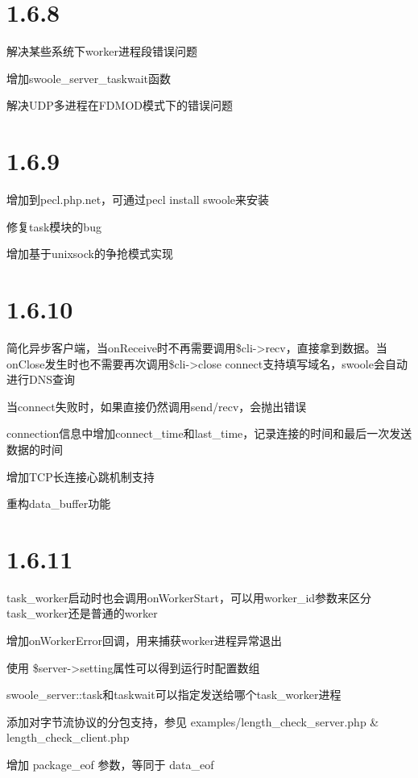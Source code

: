 \section{1.6.8}


\begin{compactitem}
\item 解决某些系统下worker进程段错误问题
\item 增加swoole\_server\_taskwait函数
\item 解决UDP多进程在FDMOD模式下的错误问题
\end{compactitem}

\section{1.6.9}

\begin{compactitem}
\item 增加到pecl.php.net，可通过pecl install swoole来安装
\item 修复task模块的bug
\item 增加基于unixsock的争抢模式实现
\end{compactitem}

\section{1.6.10}


\begin{compactitem}
\item 简化异步客户端，当onReceive时不再需要调用\$cli->recv，直接拿到数据。当onClose发生时也不需要再次调用\$cli->close
connect支持填写域名，swoole会自动进行DNS查询
\item 当connect失败时，如果直接仍然调用send/recv，会抛出错误
\item connection信息中增加connect\_time和last\_time，记录连接的时间和最后一次发送数据的时间
\item 增加TCP长连接心跳机制支持
\item 重构data\_buffer功能
\end{compactitem}

\section{1.6.11}


\begin{compactitem}
\item task\_worker启动时也会调用onWorkerStart，可以用worker\_id参数来区分task\_worker还是普通的worker
\item 增加onWorkerError回调，用来捕获worker进程异常退出
\item 使用 \$server->setting属性可以得到运行时配置数组
\item swoole\_server::task和taskwait可以指定发送给哪个task\_worker进程
\item 添加对字节流协议的分包支持，参见 examples/length\_check\_server.php \& length\_check\_client.php
\item 增加 package\_eof 参数，等同于 data\_eof
\end{compactitem}


